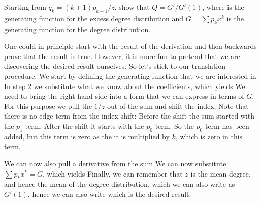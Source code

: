 Starting from $q_k=(k+1)p_{k+1}/z$, show that 
$Q=G'/G'(1)$, where is the generating function for the excess degree distribution and $G=\sum p_k x^k$ is the generating function for the degree distribution.

\solution 
One could in principle start with the result of the derivation and then backwards prove that the result is true. However, it is more fun to pretend that we are discovering the desired result ourselves. So let's stick to our translation procedure. We start by defining the generating function that we are interested in
In step 2 we substitute what we know about the coefficients, 
which yields 
We need to bring the right-hand-side into a form that we can express in terms of $G$. For this purpose we pull the $1/z$ out of the sum and shift the index,
Note that there is no edge term from the index shift: Before the shift the sum started with the $p_1$-term. After the shift it starts with the $p_0$-term. So the $p_0$ term has been added, but this term is zero as the it is multiplied by $k$, which is zero in this term. 

We can now also pull a derivative from the sum  
We can now substitute $\sum p_k x^k=G$, which yields 
Finally, we can remember that $z$ is the mean degree, and hence the mean of the degree distribution, which we can also write as $G'(1)$, hence we can also write 
which is the desired result. 
